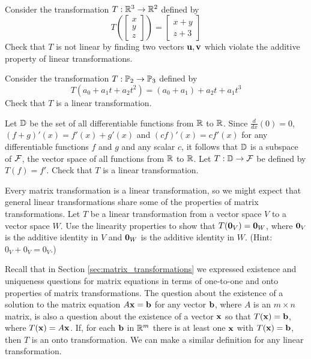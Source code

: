\begin{pa} \label{pa:8_a} ~
	\be
	\item Consider the transformation $T: \mathbb{R}^3 \to \mathbb{R}^2$ defined by 
	\[T\left( \left[ \begin{array}{cc} x\\y\\z \end{array} \right] \right) = \left[ \begin{array}{c} x+y\\z+3 \end{array} \right]\]
Check that $T$ is not linear by finding two vectors $\mathbf{u}, \mathbf{v}$ which violate the additive property of linear transformations.
	
		\item  Consider the transformation $T : \mathbb{P}_2 \to \mathbb{P}_3$ defined by
	\[T(a_0+a_1t+a_2t^2) = (a_0+a_1) + a_2t + a_1t^3\]
Check that $T$ is a linear transformation.

	\item Let $\mathbb{D}$ be the set of all differentiable functions from $\mathbb{R}$ to $\mathbb{R}$. Since $\frac{d}{dx}(0) = 0$, $(f+g)'(x) = f'(x)+g'(x)$ and $(cf)'(x) = cf'(x)$ for any differentiable functions $f$ and $g$ and any scalar $c$, it follows that $\mathbb{D}$ is a subspace of $\mathcal{F}$, the vector space of all functions from $\mathbb{R}$ to $\mathbb{R}$. Let $T: \mathbb{D} \to \mathcal{F}$ be defined by $T(f) = f'$. Check that $T$ is a linear transformation.
		
	\item Every matrix transformation is a linear transformation, so we might expect that general linear transformations share some of the properties of matrix transformations. Let $T$ be a linear transformation from a vector space $V$ to a vector space $W$. Use the linearity properties to show that $T(\mathbf{0}_V) = \mathbf{0}_W$,  where $\mathbf{0}_V$ is the additive identity in $V$ and $\mathbf{0}_W$ is the additive identity in $W$. (Hint: $0_V + 0_V = 0_V$.)


\ee

\end{pa}


Recall that in Section \ref{sec:matrix_transformations} we expressed existence and uniqueness questions for matrix equations in terms of one-to-one and onto properties of matrix transformations. The question about the existence of a solution to the matrix equation $A \mathbf{x} = \mathbf{b}$ for any vector $\mathbf{b}$, where $A$ is an $m \times n$ matrix, is also a question about the existence of a vector $\mathbf{x}$ so that $T(\mathbf{x}) = \mathbf{b}$, where $T(\mathbf{x}) = A \mathbf{x}$. If, for each $\mathbf{b}$ in $\mathbb{R}^m$ there is at least one $\mathbf{x}$ with $T(\mathbf{x}) = \mathbf{b}$, then $T$ is an onto transformation. We can make a similar definition for any linear transformation. 

